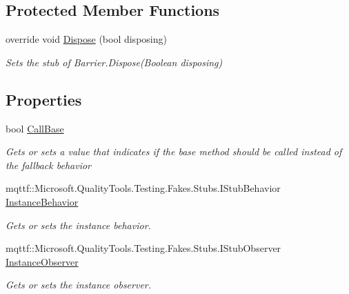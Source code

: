 \subsection*{Protected Member Functions}
\begin{DoxyCompactItemize}
\item 
override void \hyperlink{class_system_1_1_threading_1_1_fakes_1_1_stub_barrier_a8933ec25c357725a0db7b4c744d68f7f}{Dispose} (bool disposing)
\begin{DoxyCompactList}\small\item\em Sets the stub of Barrier.\-Dispose(\-Boolean disposing)\end{DoxyCompactList}\end{DoxyCompactItemize}
\subsection*{Properties}
\begin{DoxyCompactItemize}
\item 
bool \hyperlink{class_system_1_1_threading_1_1_fakes_1_1_stub_barrier_a7006aa20768ee26fcaede0156a6eeeab}{Call\-Base}
\begin{DoxyCompactList}\small\item\em Gets or sets a value that indicates if the base method should be called instead of the fallback behavior\end{DoxyCompactList}\item 
mqttf\-::\-Microsoft.\-Quality\-Tools.\-Testing.\-Fakes.\-Stubs.\-I\-Stub\-Behavior \hyperlink{class_system_1_1_threading_1_1_fakes_1_1_stub_barrier_a044d1429d260f502e808ce29bccb4dcd}{Instance\-Behavior}
\begin{DoxyCompactList}\small\item\em Gets or sets the instance behavior.\end{DoxyCompactList}\item 
mqttf\-::\-Microsoft.\-Quality\-Tools.\-Testing.\-Fakes.\-Stubs.\-I\-Stub\-Observer \hyperlink{class_system_1_1_threading_1_1_fakes_1_1_stub_barrier_a997961cd6099958e369a04c989da12a4}{Instance\-Observer}
\begin{DoxyCompactList}\small\item\em Gets or sets the instance observer.\end{DoxyCompactList}\end{DoxyCompactItemize}


